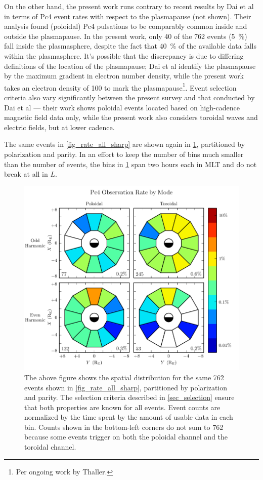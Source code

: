 On the other hand, the present work runs contrary to recent results by Dai et
al in terms
of Pc4 event rates with respect to the plasmapause (not shown). Their analysis
found (poloidal) Pc4 pulsations to be comparably common inside and outside the
plasmapause\cite{dai_2015}. In the present work, only 40 of the 762 events
(\SI{5}{\percent}) fall inside the plasmasphere, despite the fact that
\SI{40}{\percent} of the available data falls within the plasmasphere. 
It's possible that the discrepancy is due to differing definitions of the
location of the plasmapause; Dai et al
identify the plasmapause by the maximum gradient in electron number density,
while the present work takes an electron density of \SI{100}{\percc} to mark
the plasmapause\footnote{Per ongoing work by Thaller. }. Event selection
criteria also vary significantly between the present survey and that conducted
by Dai et al --- their work shows poloidal events located based on high-cadence
magnetic field data only, while the present work also considers toroidal waves
and electric fields, but at lower cadence. 

The same events in \cref{fig_rate_all_sharp} are shown again in
\cref{fig_mode_all}, partitioned by polarization and parity. In an effort to
keep the number of bins much smaller than the number of events, the bins in
\cref{fig_mode_all} span two hours each in MLT and do not break at all in $L$. 

\begin{figure}[!htb]
  \centering
  \includegraphics[width=\textwidth]{figures/mode_all.pdf}
  \caption[Rate of Pc4 Events by Mode]{
    The above figure shows the spatial distribution for the same 762 events
    shown in \cref{fig_rate_all_sharp}, partitioned by polarization and parity.
    The selection criteria described in \cref{sec_selection} ensure that both
    properties are known for all events. Event counts are normalized by the
    time spent by the amount of usable data in each bin. Counts shown in the
    bottom-left corners do not sum to 762 because some events trigger on both
    the poloidal channel and the toroidal channel. 
  }
  \label{fig_mode_all}
\end{figure}

